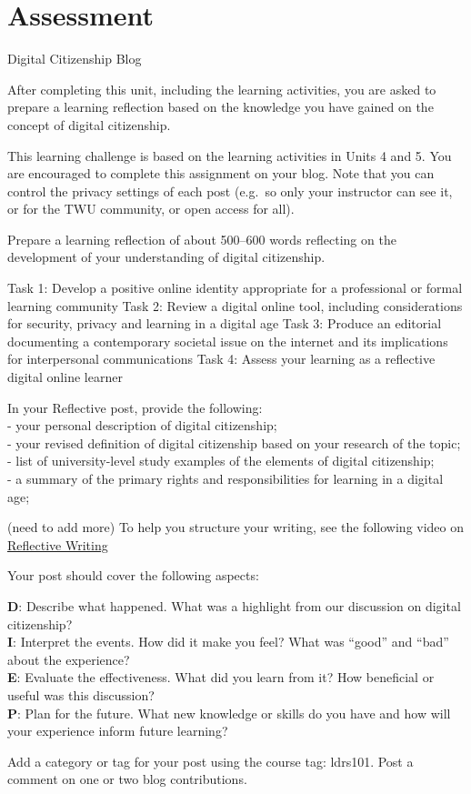 \documentclass[
]{book}
\theoremstyle{definition}
\theoremstyle{definition}
\theoremstyle{definition}
\theoremstyle{definition}
\theoremstyle{remark}
\begin{document}
\hypertarget{assessment-3}{%
\section*{Assessment}\label{assessment-3}}

\begin{assessment}
{Digital Citizenship Blog}

After completing this unit, including the learning activities, you are asked to prepare a learning reflection based on the knowledge you have gained on the concept of digital citizenship.

This learning challenge is based on the learning activities in Units 4 and 5. You are encouraged to complete this assignment on your blog. Note that you can control the privacy settings of each post (e.g.~so only your instructor can see it, or for the TWU community, or open access for all).

Prepare a learning reflection of about 500--600 words reflecting on the development of your understanding of digital citizenship.

Task 1: Develop a positive online identity appropriate for a professional or formal learning community
Task 2: Review a digital online tool, including considerations for security, privacy and learning in a digital age
Task 3: Produce an editorial documenting a contemporary societal issue on the internet and its implications for interpersonal communications
Task 4: Assess your learning as a reflective digital online learner

In your Reflective post, provide the following:\\
- your personal description of digital citizenship;\\
- your revised definition of digital citizenship based on your research of the topic;\\
- list of university-level study examples of the elements of digital citizenship;\\
- a summary of the primary rights and responsibilities for learning in a digital age;

(need to add more)
To help you structure your writing, see the following video on \href{https://www.youtube.com/watch?v=SntBj0FIApw}{Reflective Writing}

Your post should cover the following aspects:

\textbf{D}: Describe what happened. What was a highlight from our discussion on digital citizenship?\\
\textbf{I}: Interpret the events. How did it make you feel? What was ``good'' and ``bad'' about the experience?\\
\textbf{E}: Evaluate the effectiveness. What did you learn from it? How beneficial or useful was this discussion?\\
\textbf{P}: Plan for the future. What new knowledge or skills do you have and how will your experience inform future learning?

Add a category or tag for your post using the course tag: ldrs101. Post a comment on one or two blog contributions.
\end{assessment}
\end{document}
